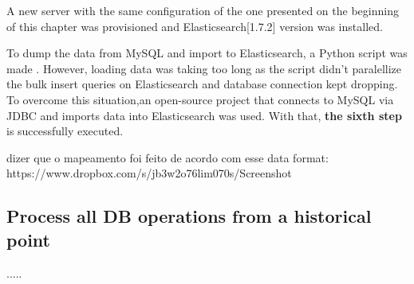 A new server with the same configuration of the one presented on the beginning of this chapter was provisioned and Elasticsearch[1.7.2] version was installed.

To dump the data from MySQL and import to Elasticsearch, a Python script was made \cite{mysqltoes}. However, loading data was taking too long as the script didn't paralellize the bulk insert queries on Elasticsearch and database connection kept dropping. To overcome this situation,an open-source project that connects to MySQL via JDBC and imports data into Elasticsearch \cite{elasticjdbc} was used. 
With that, \textbf{the sixth step} is successfully executed. 

dizer que o mapeamento foi feito de acordo com esse data format: https://www.dropbox.com/s/jb3w2o76lim070s/Screenshot%





















\clearpage
\subsection{Process all DB operations from a historical point}



.....







